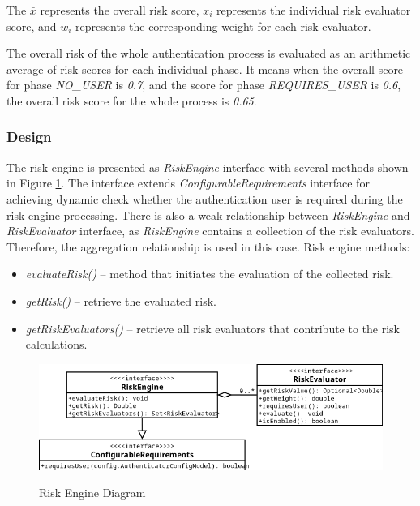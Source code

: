 The \( \bar{x} \) represents the overall risk score, \( x_i \) represents the individual risk evaluator score, and \( w_i \) represents the corresponding weight for each risk evaluator.

The overall risk of the whole authentication process is evaluated as an arithmetic average of risk scores for each individual phase.
It means when the overall score for phase \textit{NO\_USER} is \textit{0.7}, and the score for phase \textit{REQUIRES\_USER} is \textit{0.6}, the overall risk score for the whole process is \textit{0.65}. 

\newpage

\subsubsection{Design}
The risk engine is presented as \textit{RiskEngine} interface with several methods shown in Figure \ref{fig:design-user-engine-diagram}.
The interface extends \textit{ConfigurableRequirements} interface for achieving dynamic check whether the authentication user is required during the risk engine processing.
There is also a weak relationship between \textit{RiskEngine} and \textit{RiskEvaluator} interface, as \textit{RiskEngine} contains a collection of the risk evaluators.
Therefore, the aggregation relationship is used in this case. 
\newline
\newline
Risk engine methods:

\begin{itemize}
    \item \textit{evaluateRisk()} -- method that initiates the evaluation of the collected risk.
    \item \textit{getRisk()} -- retrieve the evaluated risk.
    \item \textit{getRiskEvaluators()} -- retrieve all risk evaluators that contribute to the risk calculations.
\end{itemize}

\begin{figure}[htbp]
  \centering
  \includegraphics[width=1\textwidth]{img/sections/5-design/risk-engine.png}
  \label{fig:design-user-engine-diagram}
  \caption{Risk Engine Diagram}
\end{figure}

